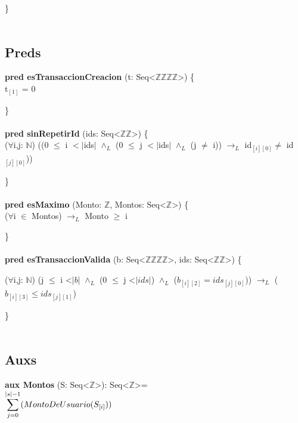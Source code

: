 \documentclass{article}
\newcommand{\Entero}{$\mathds{Z}$}
\newcommand{\Natural}{$\mathds{N}$}
\newcommand{\tuplaDeDosEnteros}{Seq\textless\Entero\texttimes\Entero\textgreater}
\newcommand{\tuplaDeCuatroEnteros}{Seq\textless\Entero\texttimes\Entero\texttimes\Entero\texttimes\Entero\textgreater}
\begin{document}
    \}\\\\

\subsection*{Preds}
    \textbf{pred esTransaccionCreacion} (t: \tuplaDeCuatroEnteros) \{\\
        \indent\indent t$_{[1]}$ = 0

    \}\\\\

    \textbf{pred sinRepetirId} (ids: \tuplaDeDosEnteros) \{\\
        \indent\indent($\forall$i,j: \Natural) ((0 $\leq$ i $<|$ids$|$ $\land_L$ (0 $\leq$ j $<|$ids$|$ $\land_L$ (j $\neq$ i))
                        $\rightarrow_L$ id$_{[i][0]} \neq$ id$_{[j][0]}$))
                        
    \}\\\\

    \textbf{pred esMaximo} (Monto: \Entero, Montos: Seq\textless$\mathds{Z}$\textgreater) \{\\
        \indent\indent($\forall$i $\in$ Montos) $\rightarrow_L$ Monto $\geq$ i

    \}\\\\

    \textbf{pred esTransaccionValida} (b: \tuplaDeCuatroEnteros, ids: \tuplaDeDosEnteros) \{

        \indent\indent($\forall$i,j: \Natural) (j $\leq$ i \textless $|b|$ $\land_L$ (0 $\leq$ j \textless $|ids|$) $\land_L$ ($b_{[i][2]} = ids_{[j][0]}$))
                                                $\rightarrow_L$ ($b_{[i][3]} \leq ids_{[j][1]}$)

    \}\\\\

\subsection*{Auxs}
    \textbf{aux Montos} (S: Seq\textless$\mathds{Z}$\textgreater): Seq\textless$\mathds{Z}$\textgreater = \\

        \indent\indent $\mathlarger\sum\limits_{j=0}^{|s|-1} (MontoDeUsuario(S_{[i]}))$\\\\\\
\end{document}
